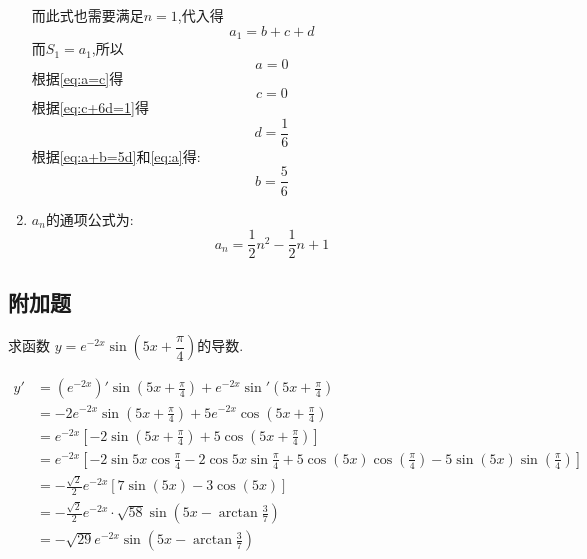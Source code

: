 \begin{questions}
\begin{solution}
\begin{enumerate}[label=\protect\circled{\arabic*}]
			      而此式也需要满足$n=1$,代入得
			      \begin{equation}
				      a_1 = b+c+d
				      \label{eq:a1}
			      \end{equation}
			      而$S_1= a_1$,所以
			      \begin{equation}
				      a= 0
				      \label{eq:a}
			      \end{equation}
			      根据\eqref{eq:a=c}得
			      \begin{equation}
				      c = 0
				      \label{eq:c}
			      \end{equation}
			      根据\eqref{eq:c+6d=1}得
			      \begin{equation}
				      d = \frac16
				      \label{eq:d}
			      \end{equation}
			      根据\eqref{eq:a+b=5d}和\eqref{eq:a}得:
			      \begin{equation}
				      b = \frac56
				      \label{eq:b}
			      \end{equation}

			\item $a_n$的通项公式为:
			      \begin{equation*}
				      a_n = \frac12n^2 - \frac12n + 1
			      \end{equation*}

		\end{enumerate}

	\end{solution}
	\begin{center}
		\section*{附加题}
	\end{center}
	\question 求函数 $y = e^{-2x}\sin\left(5x+\dfrac{\pi}{4}\right)$的导数.
	\begin{solution}
		\begin{align*}
			y' & =  (e^{-2x})'\sin\left(5x + \frac{\pi}{4}\right) + e^{-2x}\sin'\left(5x +
			\frac{\pi}{4}\right)                                                           \\
			   & = -2e^{-2x}\sin\left(5x+\frac{\pi}{4}\right) +
			5e^{-2x}\cos\left(5x+\frac{\pi}{4}\right)                                      \\
			   & = e^{-2x}\left[-2\sin\left(5x + \frac{\pi}{4}\right) + 5\cos\left(5x +
			\frac{\pi}{4}\right)\right]                                                    \\
			   & = e^{-2x}\left[-2\sin5x\cos\frac{\pi}{4} - 2\cos5x\sin\frac{\pi}{4} +
			5\cos(5x)\cos(\frac{\pi}{4}) - 5\sin(5x)\sin(\frac{\pi}{4})\right]             \\
			   & = -\frac{\sqrt{2}}{2}e^{-2x}[7\sin(5x) - 3\cos(5x)]                       \\
			   & = -\frac{\sqrt{2}}{2}e^{-2x}\cdot \sqrt{58}\sin({5x-\arctan{\frac37}})    \\
			   & = -\sqrt{29}e^{-2x}\sin(5x-\arctan\frac37)
		\end{align*}
	\end{solution}


\end{questions}
